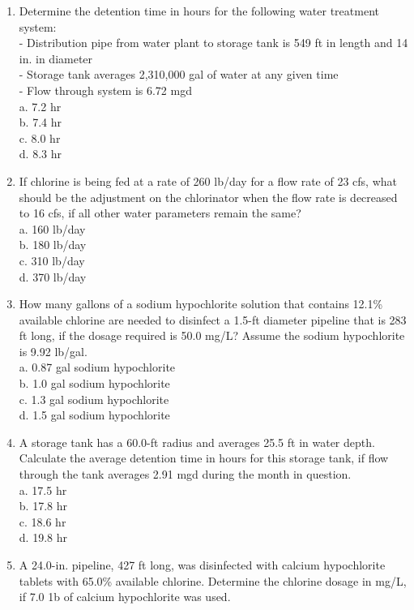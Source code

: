 \documentclass{article}
\begin{document}
\begin{enumerate}
\item Determine the detention time in hours for the following water treatment system:\\
-	Distribution pipe from water plant to storage tank is 549 ft in length and 14 in. in diameter\\
-	Storage tank averages 2,310,000 gal of water at any given time\\
-	Flow through system is 6.72 mgd\\
a.	7.2 hr\\
b.	7.4 hr\\
c.	8.0 hr\\
d.	8.3 hr\\
\item If chlorine is being fed at a rate of 260 lb/day for a flow rate of 23 cfs, what should be the adjustment on the chlorinator when the flow rate is decreased to 16 cfs, if all other water parameters remain the same?\\
a.	160 lb/day\\
b.	180 lb/day\\
c.	310 lb/day\\
d.	370 lb/day\\
\item How many gallons of a sodium hypochlorite solution that contains 12.1\% available chlorine are needed to disinfect a 1.5-ft diameter pipeline that is 283 ft long, if the dosage required is 50.0 mg/L? Assume the sodium hypochlorite is 9.92 lb/gal.\\
a.	0.87 gal sodium hypochlorite\\
b.	1.0 gal sodium hypochlorite\\
c.	1.3 gal sodium hypochlorite\\
d.	1.5 gal sodium hypochlorite\\
\item A storage tank has a 60.0-ft radius and averages 25.5 ft in water depth. Calculate the average detention time in hours for this storage tank, if flow through the tank averages 2.91 mgd during the month in question.\\
a.	17.5 hr\\
b.	17.8 hr\\
c.	18.6 hr\\
d.	19.8 hr\\
\item A 24.0-in. pipeline, 427 ft long, was disinfected with calcium hypochlorite tablets with 65.0\% available chlorine. Determine the chlorine dosage in mg/L, if 7.0 1b of calcium hypochlorite was used.\\

\end{enumerate}
\end{document}
